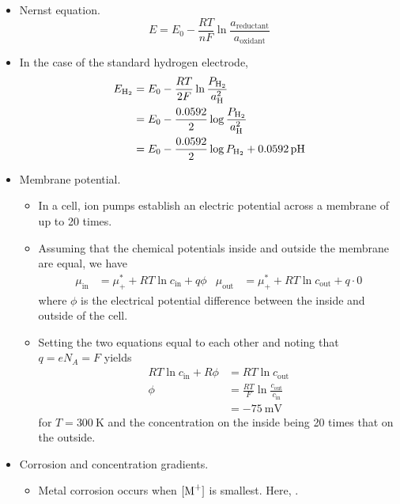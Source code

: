 \documentclass[../notes.tex]{subfiles}
\begin{document}
\begin{itemize}
\begin{itemize}
\begin{itemize}
        \end{itemize}
    \end{itemize}
    \item Nernst equation.
    \begin{equation*}
        E = E_0-\frac{RT}{nF}\ln\frac{a_\text{reductant}}{a_\text{oxidant}}
    \end{equation*}
    \item In the case of the standard hydrogen electrode,
    \begin{align*}
        E_{\ce{H2}} &= E_0-\frac{RT}{2F}\ln\frac{P_{\ce{H2}}}{a_{\ce{H}}^2}\\
        &= E_0-\frac{0.0592}{2}\log\frac{P_{\ce{H2}}}{a_{\ce{H}}^2}\\
        &= E_0-\frac{0.0592}{2}\log P_{\ce{H2}}+0.0592\pH
    \end{align*}
    \item Membrane potential.
    \begin{itemize}
        \item In a cell, ion pumps establish an electric potential across a membrane of up to 20 times.
        \item Assuming that the chemical potentials inside and outside the membrane are equal, we have
        \begin{align*}
            \mu_\text{in} &= \mu_+^*+RT\ln c_\text{in}+q\phi&
            \mu_\text{out} &= \mu_+^*+RT\ln c_\text{out}+q\cdot 0
        \end{align*}
        where $\phi$ is the electrical potential difference between the inside and outside of the cell.
        \item Setting the two equations equal to each other and noting that $q=eN_A=F$ yields
        \begin{align*}
            RT\ln c_\text{in}+R\phi &= RT\ln c_\text{out}\\
            \phi &= \frac{RT}{F}\ln\frac{c_\text{out}}{c_\text{in}}\\
            &= -\SI{75}{\milli\volt}
        \end{align*}
        for $T=\SI{300}{\kelvin}$ and the concentration on the inside being 20 times that on the outside.
    \end{itemize}
    \item Corrosion and concentration gradients.
    \begin{itemize}
        \item Metal corrosion occurs when $[\ce{M+}]$ is smallest. Here, .

\end{itemize}
\end{itemize}
\end{document}
